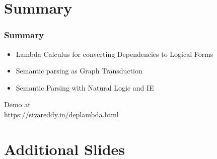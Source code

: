 \documentclass[mathserif,12pt]{beamer}
\newcommand{\hlight}[1]{{\color{blue!80} #1}}
\begin{document}
\section{Summary}
\begin{frame}
\frametitle{Summary}
\begin{itemize}
 \item Lambda Calculus for converting Dependencies to Logical Forms
 
 \vspace{1em} 
 \item Semantic parsing as Graph Transduction

 \vspace{1em}
 \item Semantic Parsing with Natural Logic and IE
\end{itemize}

\pause
\begin{center}Demo at\\ \hlight{\url{https://sivareddy.in/deplambda.html}} \\
\end{center}
\end{frame}

\section{Additional Slides}
\end{document}

